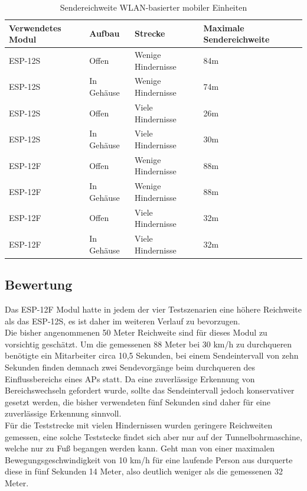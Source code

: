 \begin{table}[h]
	\centering
	\caption{Sendereichweite WLAN-basierter mobiler Einheiten}
	\label{table:rangewifi}
	\begin{tabular}{p{3.5cm}|p{3cm}|p{3.5cm}|p{3cm}}
		Verwendetes Modul & Aufbau & Strecke & Maximale Sendereichweite \\
		\hline
		ESP-12S & Offen & Wenige Hindernisse & 84m \\
		ESP-12S & In Gehäuse & Wenige Hindernisse & 74m \\
		ESP-12S & Offen & Viele Hindernisse & 26m \\
		ESP-12S & In Gehäuse & Viele Hindernisse & 30m \\
		\hline
		ESP-12F & Offen & Wenige Hindernisse & 88m \\
		ESP-12F & In Gehäuse & Wenige Hindernisse & 88m \\
		ESP-12F & Offen & Viele Hindernisse & 32m \\
		ESP-12F & In Gehäuse & Viele Hindernisse & 32m \\
	\end{tabular}
\end{table}


\subsection{Bewertung}
\label{ch:Reichweite:sec:bewertung}
Das ESP-12F Modul hatte in jedem der vier Testszenarien eine höhere Reichweite als das ESP-12S, es ist daher im weiteren Verlauf zu bevorzugen.\\
Die bisher angenommenen 50 Meter Reichweite sind für dieses Modul zu vorsichtig geschätzt. 
Um die gemessenen 88 Meter bei 30 km/h zu durchqueren benötigte ein Mitarbeiter circa 10,5 Sekunden, bei einem Sendeintervall von zehn Sekunden finden demnach zwei Sendevorgänge beim durchqueren des Einflussbereichs eines APs statt.
Da eine zuverlässige Erkennung von Bereichswechseln gefordert wurde, sollte das Sendeintervall jedoch konservativer gesetzt werden, die bisher verwendeten fünf Sekunden sind daher für eine zuverlässige Erkennung sinnvoll.
\\
Für die Teststrecke mit vielen Hindernissen wurden geringere Reichweiten gemessen, eine solche Teststecke findet sich aber nur auf der Tunnelbohrmaschine, welche nur zu Fuß begangen werden kann. 
Geht man von einer maximalen Bewegungsgeschwindigkeit von 10 km/h für eine laufende Person aus durquerte diese in fünf Sekunden 14 Meter, also deutlich weniger als die gemessenen 32 Meter.\\

